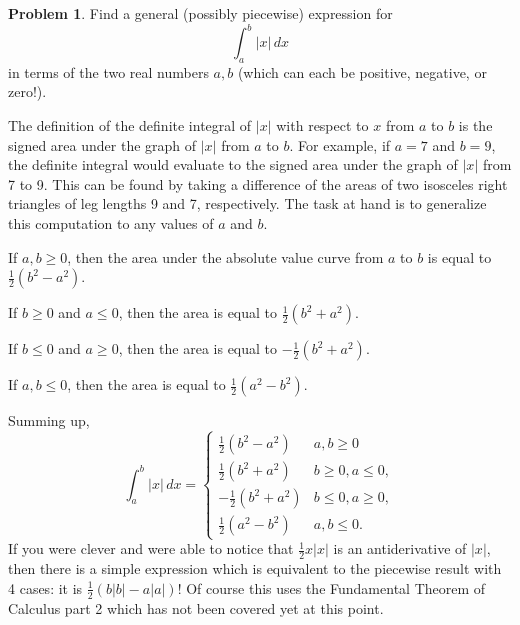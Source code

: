 \documentclass[11pt,oneside]{amsart}
\theoremstyle{definition}
\newtheorem{problem}{Problem}
\begin{document}
    \begin{problem}
        Find a general (possibly piecewise) expression for
        \[\int_a^b |x|\,dx\]
        in terms of the two real numbers $a,b$ (which can each 
        be positive, negative, or zero!).
    \end{problem}
    \begin{solution}
        The definition of the definite integral of $|x|$ with respect to $x$ from $a$ to $b$ is the signed area under the graph of $|x|$ from $a$ to $b$. For example, if $a=7$ and $b=9$, the definite integral would evaluate to the signed area under the graph of $|x|$ from 7 to 9. This can be found by taking a difference of the areas of two isosceles right triangles of leg lengths 9 and 7, respectively. The task at hand is to generalize this computation to any values of $a$ and $b$.

        If $a,b\geq 0$, then the area under the absolute value curve from $a$ to $b$ is equal to $\frac 12(b^2-a^2)$.

        If $b\geq 0$ and $a\leq 0$, then the area is equal to $\frac12(b^2+a^2)$.

        If $b\leq 0$ and $a\geq 0$, then the area is equal to $-\frac12(b^2+a^2)$.

        If $a,b\leq 0$, then the area is equal to $\frac 12(a^2-b^2)$.

        Summing up,
        \[\int_a^b|x|\,dx = \begin{cases}\frac 12(b^2-a^2)& a,b\geq 0\\
            \frac 12(b^2+a^2)& b\geq 0,a\leq 0,\\
            -\frac12(b^2+a^2) &b\leq 0,a\geq 0,\\
            \frac 12(a^2-b^2) &a,b\leq 0.
        \end{cases}\]
        If you were clever and were able to notice that $\frac12 x|x|$ is an antiderivative of $|x|$, then there is a simple expression which is equivalent to the piecewise result with 4 cases: it is $\frac 12(b|b|-a|a|)$! Of course this uses the Fundamental Theorem of Calculus part 2 which has not been covered yet at this point.
    \end{solution}
\end{document}
